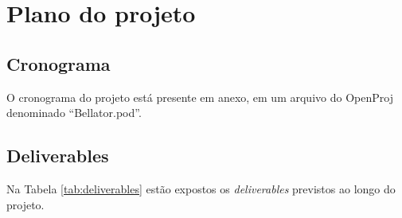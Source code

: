 \chapter{Plano do projeto}
\section{Cronograma}
O cronograma do projeto está presente em anexo, em um arquivo do OpenProj denominado ``Bellator.pod''.

\section{Deliverables}

Na Tabela \ref{tab:deliverables} estão expostos os \textit{deliverables} previstos ao longo do projeto.


